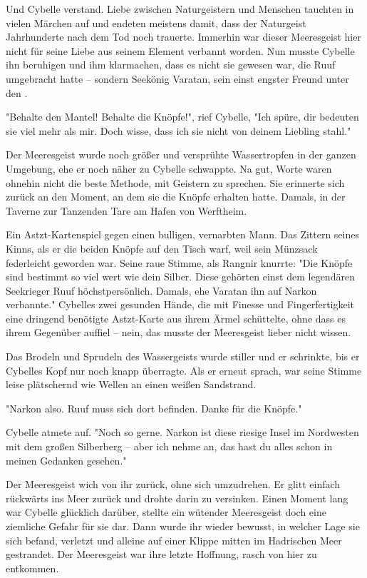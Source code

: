 Und Cybelle verstand. Liebe zwischen Naturgeistern und Menschen tauchten in vielen Märchen auf und endeten meistens damit, dass der Naturgeist Jahrhunderte nach dem Tod  noch trauerte. Immerhin war dieser Meeresgeist hier nicht für seine Liebe aus seinem Element verbannt worden. Nun musste Cybelle ihn beruhigen und ihm klarmachen, dass es nicht sie gewesen war, die Ruuf umgebracht hatte – sondern Seekönig Varatan, sein einst engster Freund unter den .

"Behalte den Mantel! Behalte die Knöpfe!", rief Cybelle, "Ich spüre, dir bedeuten sie viel mehr als mir. Doch wisse, dass ich sie nicht von deinem Liebling stahl."

Der Meeresgeist wurde noch größer und versprühte Wassertropfen in der ganzen Umgebung, ehe er noch näher zu Cybelle schwappte. Na gut, Worte waren ohnehin nicht die beste Methode, mit Geistern zu sprechen. Sie erinnerte sich zurück an den Moment, an dem sie die Knöpfe erhalten hatte. Damals, in der Taverne zur Tanzenden Tare am Hafen von Werftheim.

Ein Astzt-Kartenspiel gegen einen bulligen, vernarbten Mann. Das Zittern seines Kinns, als er die beiden Knöpfe auf den Tisch warf, weil sein Münzsack federleicht geworden war. 
Seine raue Stimme, als Rangnir knurrte: "Die Knöpfe sind bestimmt so viel wert wie dein Silber. Diese gehörten einst dem legendären Seekrieger Ruuf höchstpersönlich. Damals, ehe Varatan ihn auf Narkon verbannte." Cybelles zwei gesunden Hände, die mit Finesse und Fingerfertigkeit eine dringend benötigte Astzt-Karte aus ihrem Ärmel schüttelte, ohne dass es ihrem Gegenüber auffiel – nein, das musste der Meeresgeist lieber nicht wissen.

Das Brodeln und Sprudeln des Wassergeists wurde stiller und er schrinkte, bis er Cybelles Kopf nur noch knapp überragte. Als er erneut sprach, war seine Stimme leise plätschernd wie Wellen an einen weißen Sandstrand.

"Narkon also. Ruuf muss sich dort befinden. Danke für die Knöpfe."

Cybelle atmete auf. "Noch so gerne. Narkon ist diese riesige Insel im Nordwesten mit dem großen Silberberg – aber ich nehme an, das hast du alles schon in meinen Gedanken gesehen."

Der Meeresgeist wich von ihr zurück, ohne sich umzudrehen. Er glitt einfach rückwärts ins Meer zurück und drohte darin zu versinken. Einen Moment lang war Cybelle glücklich darüber, stellte ein wütender Meeresgeist doch eine ziemliche Gefahr für sie dar. Dann wurde ihr wieder bewusst, in welcher Lage sie sich befand, verletzt und alleine auf einer Klippe mitten im Hadrischen Meer gestrandet. Der Meeresgeist war ihre letzte Hoffnung, rasch von hier zu entkommen.


